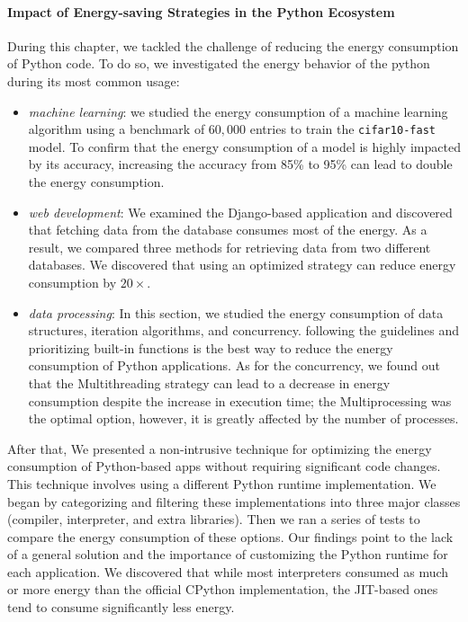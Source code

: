 \paragraph*{Impact of Energy-saving Strategies in the Python Ecosystem}
During this chapter, we tackled the challenge of reducing the energy consumption of Python code.
To do so, we investigated the energy behavior of the python during its most common usage:
\begin{itemize}
      \item \emph{machine learning}:  we studied the energy consumption of a machine learning algorithm using a benchmark of $60,000$ entries to train the \texttt{cifar10-fast} model. To confirm that the energy consumption of a model is highly impacted by its accuracy, increasing the accuracy from 85\% to 95\% can lead to double the energy consumption.
      \item \emph{web development}: We examined the Django-based application and discovered that fetching data from the database consumes most of the energy. As a result, we compared three methods for retrieving data from two different databases. We discovered that using an optimized strategy can reduce energy consumption by $20\times$.
      \item \emph{data processing}: In this section, we studied the energy consumption of data structures, iteration algorithms, and concurrency.  following the guidelines and prioritizing built-in functions is the best way to reduce the energy consumption of Python applications.
      As for the concurrency, we found out that the \textsf{Multithreading} strategy can lead to a decrease in energy consumption despite the increase in execution time; the \textsf{Multiprocessing} was the optimal option, however, it is greatly affected by the number of processes.
\end{itemize}
After that, We presented a non-intrusive technique for optimizing the energy consumption of Python-based apps without requiring significant code changes.
This technique involves using a different Python runtime implementation.
We began by categorizing and filtering these implementations into three major classes (compiler, interpreter, and extra libraries).
Then we ran a series of tests to compare the energy consumption of these options.
Our findings point to the lack of a general solution and the importance of customizing the Python runtime for each application.
We discovered that while most interpreters consumed as much or more energy than the official CPython implementation, the JIT-based ones tend to consume significantly less energy.

